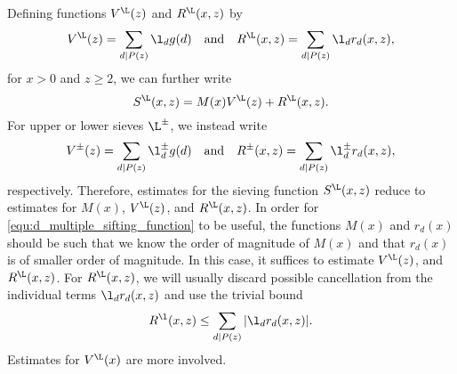    Defining functions $V^{\L}(z)$ and $R^{\L}(x,z)$ by
     \[
      V^{\L}(z) = \sum_{d \mid P(z)}\l_{d}g(d) \quad \text{and} \quad R^{\L}(x,z) = \sum_{d \mid P(z)}\l_{d}r_{d}(x,z),
    \]
    for $x > 0$ and $z \ge 2$, we can further write
    \[
      S^{\L}(x,z) = M(x)V^{\L}(z)+R^{\L}(x,z).
    \]
    For upper or lower sieves $\L^{\pm}$, we instead write
     \[
      V^{\pm}(z) = \sum_{d \mid P(z)}\l_{d}^{\pm}g(d) \quad \text{and} \quad R^{\pm}(x,z) = \sum_{d \mid P(z)}\l_{d}^{\pm}r_{d}(x,z),
    \]
    respectively. Therefore, estimates for the sieving function $S^{\L}(x,z)$ reduce to estimates for $M(x)$, $V^{\L}(z)$, and $R^{\L}(x,z)$. In order for \cref{equ:d_multiple_sifting_function} to be useful, the functions $M(x)$ and $r_{d}(x)$ should be such that we know the order of magnitude of $M(x)$ and that $r_{d}(x)$ is of smaller order of magnitude. In this case, it suffices to estimate $V^{\L}(z)$, and $R^{\L}(x,z)$. For $R^{\L}(x,z)$, we will usually discard possible cancellation from the individual terms $\l_{d}r_{d}(x,z)$ and use the trivial bound
    \[
      R^{\l}(x,z) \le \sum_{d \mid P(z)}|\l_{d}r_{d}(x,z)|.
    \]
    Estimates for $V^{\L}(x)$ are more involved. 
  \section{}

